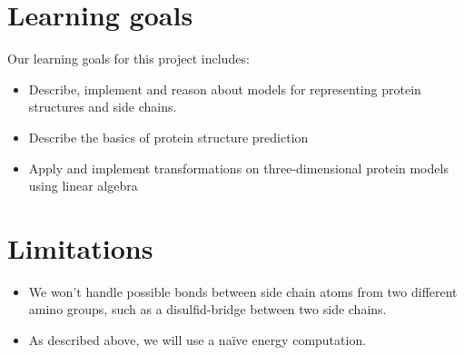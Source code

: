 \documentclass[10pt,a4paper,final,oneside,openany,article]{memoir}
\begin{document}
\section{Learning goals}
Our learning goals for this project includes:
\begin{itemize}
\item Describe, implement and reason about models for representing
  protein structures and side chains.
\item Describe the basics of protein structure prediction
\item Apply and implement transformations on three-dimensional protein
  models using linear algebra
\end{itemize}


\section{Limitations}
\begin{itemize}
\item We won't handle possible bonds between side chain
  atoms from two different amino groups, such as a disulfid-bridge
  between two side chains.
\item As described above, we will use a naïve energy computation.
\end{itemize}

\printbibliography
\end{document}
